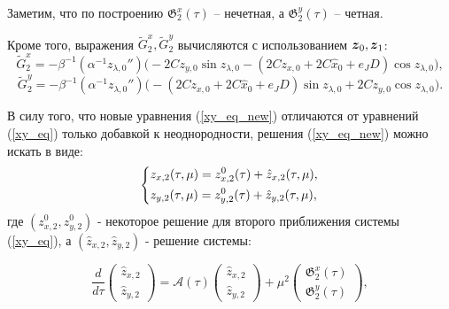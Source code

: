 Заметим, что по построению $\mathfrak{G}_2^x(\tau)$ -- нечетная, а $\mathfrak{G}_2^y(\tau)$ -- четная.

Кроме того, выражения $\tilde G_2^x, \tilde G_2^y$ вычисляются с использованием $\boldsymbol{z}_0, \boldsymbol{z}_1$:
\begin{equation*}
\tilde{G}_2^x = -\beta^{-1} \left(\alpha^{-1} z_{\lambda,0}'' \right) \big( -2Cz_{y,0} \sin z_{\lambda,0} - (2C z_{x,0}+2C \hat x_0+e_JD) \cos z_{\lambda,0} \big),
\end{equation*}
\begin{equation*}
\tilde{G}_2^y = -\beta^{-1} \left(\alpha^{-1} z_{\lambda,0}'' \right) \big( -(2C z_{x,0}+2C \hat x_0+e_JD) \sin z_{\lambda,0} + 2C z_{y,0} \cos z_{\lambda,0} \big).
\end{equation*}


В силу того, что новые уравнения (\ref{xy_eq_new}) отличаются от уравнений (\ref{xy_eq}) только добавкой к неоднородности, решения (\ref{xy_eq_new}) можно искать в виде:
\begin{equation*}
    \begin{dcases}
        z_{x,2}(\tau,\mu) = z_{x,2}^0(\tau) + \hat z_{x,2}(\tau, \mu), \\
        z_{y,2}(\tau,\mu) = z_{y,2}^0(\tau) + \hat z_{y,2}(\tau, \mu),
    \end{dcases}
\end{equation*}
где $(z_{x,2}^0, z_{y,2}^0)$ - некоторое решение для второго приближения системы (\ref{xy_eq}), а $(\hat z_{x,2},\hat z_{y,2})$ - решение системы:

\begin{equation*}
\frac{d}{d\tau} \begin{pmatrix} \hat z_{x,2} \\ \hat z_{y,2} \end{pmatrix} = 
\mathcal{A}(\tau) \begin{pmatrix} \hat z_{x,2} \\ \hat z_{y,2} \end{pmatrix} +  
\mu^2 \begin{pmatrix} 
\mathfrak{G}_2^x(\tau) \\ 
\mathfrak{G}_2^y(\tau)
\end{pmatrix},
\label{xy_eq_new2}
\end{equation*}

